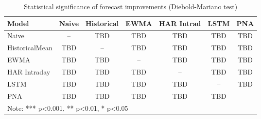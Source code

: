 \documentclass[journal]{IEEEtran}
\begin{document}
\begin{table}[!t]
\centering
\caption{Statistical significance of forecast improvements (Diebold-Mariano test)}
\label{tab:statistical_tests}
\begin{tabular}{lcccccc}
\toprule
Model & Naive & Historical & EWMA & HAR Intrad & LSTM & PNA \\
\midrule
Naive & -- & TBD & TBD & TBD & TBD & TBD \\
HistoricalMean & TBD & -- & TBD & TBD & TBD & TBD \\
EWMA & TBD & TBD & -- & TBD & TBD & TBD \\
HAR Intraday & TBD & TBD & TBD & -- & TBD & TBD \\
LSTM & TBD & TBD & TBD & TBD & -- & TBD \\
PNA & TBD & TBD & TBD & TBD & TBD & -- \\
\bottomrule
\multicolumn{7}{l}{\footnotesize Note: *** p<0.001, ** p<0.01, * p<0.05}
\end{tabular}
\end{table}
\end{document}
